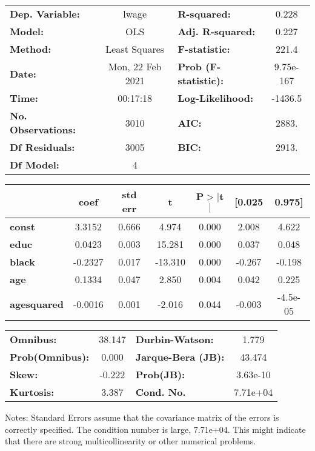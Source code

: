 \begin{center}
\begin{tabular}{lclc}
\toprule
\textbf{Dep. Variable:}    &      lwage       & \textbf{  R-squared:         } &     0.228   \\
\textbf{Model:}            &       OLS        & \textbf{  Adj. R-squared:    } &     0.227   \\
\textbf{Method:}           &  Least Squares   & \textbf{  F-statistic:       } &     221.4   \\
\textbf{Date:}             & Mon, 22 Feb 2021 & \textbf{  Prob (F-statistic):} & 9.75e-167   \\
\textbf{Time:}             &     00:17:18     & \textbf{  Log-Likelihood:    } &   -1436.5   \\
\textbf{No. Observations:} &        3010      & \textbf{  AIC:               } &     2883.   \\
\textbf{Df Residuals:}     &        3005      & \textbf{  BIC:               } &     2913.   \\
\textbf{Df Model:}         &           4      & \textbf{                     } &             \\
\bottomrule
\end{tabular}
\begin{tabular}{lcccccc}
                    & \textbf{coef} & \textbf{std err} & \textbf{t} & \textbf{P$> |$t$|$} & \textbf{[0.025} & \textbf{0.975]}  \\
\midrule
\textbf{const}      &       3.3152  &        0.666     &     4.974  &         0.000        &        2.008    &        4.622     \\
\textbf{educ}       &       0.0423  &        0.003     &    15.281  &         0.000        &        0.037    &        0.048     \\
\textbf{black}      &      -0.2327  &        0.017     &   -13.310  &         0.000        &       -0.267    &       -0.198     \\
\textbf{age}        &       0.1334  &        0.047     &     2.850  &         0.004        &        0.042    &        0.225     \\
\textbf{agesquared} &      -0.0016  &        0.001     &    -2.016  &         0.044        &       -0.003    &     -4.5e-05     \\
\bottomrule
\end{tabular}
\begin{tabular}{lclc}
\textbf{Omnibus:}       & 38.147 & \textbf{  Durbin-Watson:     } &    1.779  \\
\textbf{Prob(Omnibus):} &  0.000 & \textbf{  Jarque-Bera (JB):  } &   43.474  \\
\textbf{Skew:}          & -0.222 & \textbf{  Prob(JB):          } & 3.63e-10  \\
\textbf{Kurtosis:}      &  3.387 & \textbf{  Cond. No.          } & 7.71e+04  \\
\bottomrule
\end{tabular}
\end{center}

Notes: \newline
 [1] Standard Errors assume that the covariance matrix of the errors is correctly specified. \newline
 [2] The condition number is large, 7.71e+04. This might indicate that there are \newline
 strong multicollinearity or other numerical problems.
